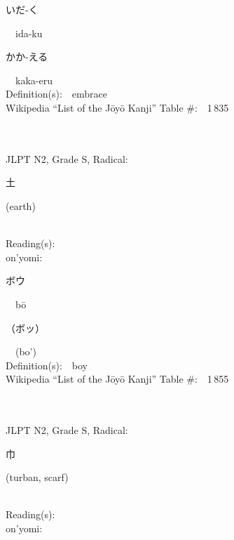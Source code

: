 \begin{multicols}{2}
{\hspace*{2em}}{\begin{CJK}{UTF8}{min} いだ-く \end{CJK}}\ \ ida-ku\ \ \\
{\hspace*{2em}}{\begin{CJK}{UTF8}{min} かか-える \end{CJK}}\ \ kaka-eru\ \ \\
Definition(s):\ \ embrace \\
Wikipedia ``List of the J\=oy\=o Kanji'' Table \#:\ \ 1\,835 \\
\ \ \\
{\fontsize{34pt}{40pt}  }\ \ \\  %
{JLPT N2, Grade S, Radical:\ \ {\begin{CJK}{UTF8}{min} 土 \end{CJK}} (earth) } \\
Reading(s):\ \ \\
{\hspace*{1em}}on'yomi:\ \ \\
{\hspace*{2em}}{\begin{CJK}{UTF8}{min} ボウ \end{CJK}}\ \ b\=o\ \ \\
{\hspace*{2em}}{\begin{CJK}{UTF8}{min} （ボッ） \end{CJK}}\ \ (bo')\ \ \\
Definition(s):\ \ boy \\
Wikipedia ``List of the J\=oy\=o Kanji'' Table \#:\ \ 1\,855 \\
\ \ \\
{\fontsize{34pt}{40pt}  }\ \ \\  %
{JLPT N2, Grade S, Radical:\ \ {\begin{CJK}{UTF8}{min} 巾 \end{CJK}} (turban, scarf) } \\
Reading(s):\ \ \\
{\hspace*{1em}}on'yomi:\ \ \\

\end{multicols}
